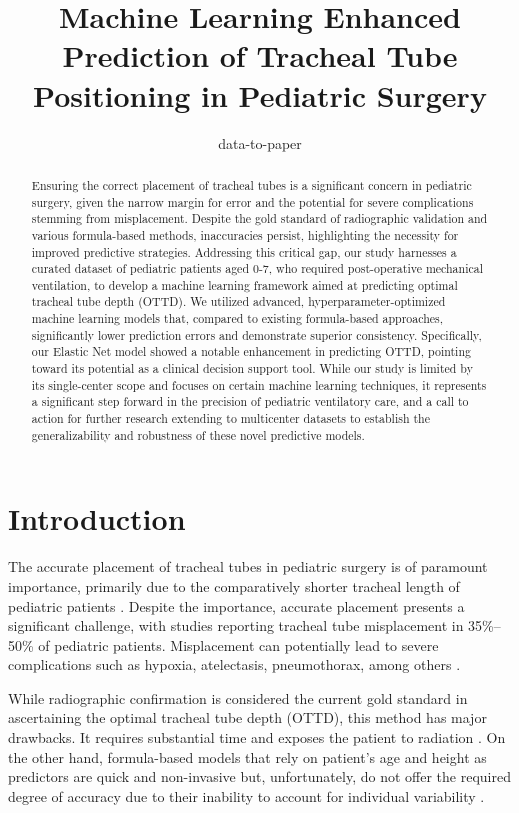 \documentclass[11pt]{article}
\title{Machine Learning Enhanced Prediction of Tracheal Tube Positioning in Pediatric Surgery}
\author{data-to-paper}
\begin{document}
\maketitle
\begin{abstract}
Ensuring the correct placement of tracheal tubes is a significant concern in pediatric surgery, given the narrow margin for error and the potential for severe complications stemming from misplacement. Despite the gold standard of radiographic validation and various formula-based methods, inaccuracies persist, highlighting the necessity for improved predictive strategies. Addressing this critical gap, our study harnesses a curated dataset of pediatric patients aged 0-7, who required post-operative mechanical ventilation, to develop a machine learning framework aimed at predicting optimal tracheal tube depth (OTTD). We utilized advanced, hyperparameter-optimized machine learning models that, compared to existing formula-based approaches, significantly lower prediction errors and demonstrate superior consistency. Specifically, our Elastic Net model showed a notable enhancement in predicting OTTD, pointing toward its potential as a clinical decision support tool. While our study is limited by its single-center scope and focuses on certain machine learning techniques, it represents a significant step forward in the precision of pediatric ventilatory care, and a call to action for further research extending to multicenter datasets to establish the generalizability and robustness of these novel predictive models.
\end{abstract}
\section*{Introduction}

The accurate placement of tracheal tubes in pediatric surgery is of paramount importance, primarily due to the comparatively shorter tracheal length of pediatric patients \cite{Kollef1994EndotrachealTM}. Despite the importance, accurate placement presents a significant challenge, with studies reporting tracheal tube misplacement in 35\%--50\% of pediatric patients. Misplacement can potentially lead to severe complications such as hypoxia, atelectasis, pneumothorax, among others \cite{Cook2005ThePL, Apfelbaum20212022AS}. 

While radiographic confirmation is considered the current gold standard in ascertaining the optimal tracheal tube depth (OTTD), this method has major drawbacks. It requires substantial time and exposes the patient to radiation \cite{Rajajee2011RealtimeUP}. On the other hand, formula-based models that rely on patient's age and height as predictors are quick and non-invasive but, unfortunately, do not offer the required degree of accuracy due to their inability to account for individual variability \cite{Yoo2021DeepLF, Hussain2011MachinabilityOG}. 
\end{document}
